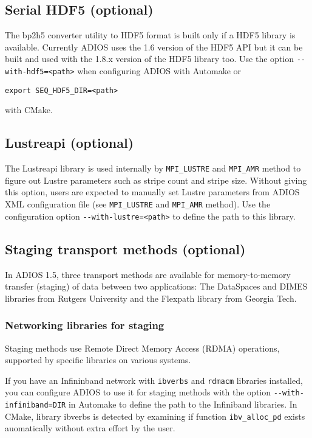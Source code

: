 \subsection{Serial HDF5 (optional)}

The bp2h5 converter utility to HDF5 format is built only if a HDF5 library is available. 
Currently ADIOS uses the 1.6 version of the HDF5 API but it can be built and used 
with the 1.8.x version of the HDF5 library too. Use the option \verb+--with-hdf5=<path>+ 
when configuring ADIOS with Automake or 
\begin{lstlisting}
export SEQ_HDF5_DIR=<path>
\end{lstlisting}
\noindent with CMake.

\subsection{Lustreapi (optional)}

The Lustreapi library is used internally by \verb+MPI_LUSTRE+ and \verb+MPI_AMR+ method to 
figure out Lustre parameters such as stripe count and stripe size.  Without giving 
this option, users are expected to manually set Lustre parameters from ADIOS XML 
configuration file (see \verb+MPI_LUSTRE+ and \verb+MPI_AMR+ method). 
Use the configuration option
\verb+--with-lustre=<path>+ to define the path to this library.

\subsection{Staging transport methods (optional)}

In ADIOS 1.5, three transport methods
are available for memory-to-memory transfer (staging) of data between two 
applications: The DataSpaces and DIMES libraries from Rutgers University and
the Flexpath library from Georgia Tech.

\subsubsection{Networking libraries for staging}

Staging methods use Remote Direct Memory Access (RDMA) operations, supported by specific libraries 
on various systems. 

\vspace*{6pt}
If you have an Infininband network with \verb+ibverbs+ and \verb+rdmacm+ libraries installed, you can configure ADIOS to use it for staging methods with the option
\verb+--with-infiniband=DIR+  in Automake to define the path to the Infiniband libraries. In CMake, library ibverbs is detected by examining if function \verb+ibv_alloc_pd+ exists auomatically without extra effort by the user.

